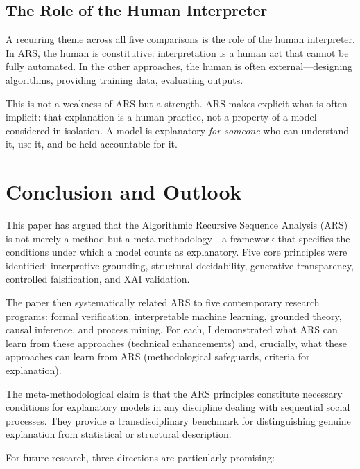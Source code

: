 \documentclass[12pt,a4paper]{article}
\begin{document}
\subsection{The Role of the Human Interpreter}

A recurring theme across all five comparisons is the role of the human 
interpreter. In ARS, the human is constitutive: interpretation is a human 
act that cannot be fully automated. In the other approaches, the human 
is often external—designing algorithms, providing training data, evaluating 
outputs.

This is not a weakness of ARS but a strength. ARS makes explicit what is 
often implicit: that explanation is a human practice, not a property of a 
model considered in isolation. A model is explanatory \textit{for someone} 
who can understand it, use it, and be held accountable for it.

\section{Conclusion and Outlook}

This paper has argued that the Algorithmic Recursive Sequence Analysis 
(ARS) is not merely a method but a meta-methodology—a framework that 
specifies the conditions under which a model counts as explanatory. 
Five core principles were identified: interpretive grounding, structural 
decidability, generative transparency, controlled falsification, and XAI 
validation.

The paper then systematically related ARS to five contemporary research 
programs: formal verification, interpretable machine learning, grounded 
theory, causal inference, and process mining. For each, I demonstrated 
what ARS can learn from these approaches (technical enhancements) and, 
crucially, what these approaches can learn from ARS (methodological 
safeguards, criteria for explanation).

The meta-methodological claim is that the ARS principles constitute 
necessary conditions for explanatory models in any discipline dealing 
with sequential social processes. They provide a transdisciplinary 
benchmark for distinguishing genuine explanation from statistical or 
structural description.

For future research, three directions are particularly promising:
\end{document}
